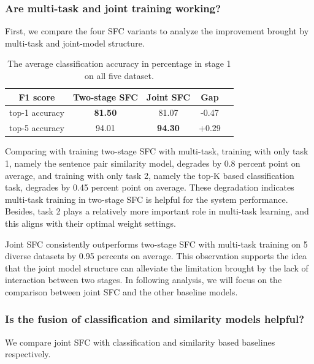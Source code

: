 \subsubsection*{Are multi-task and joint training working?} 
First, we compare the four  SFC  variants to analyze the improvement
brought  by  multi-task  and  joint-model  structure. 

\begin{table}
  \begin{centering}
    \begin{tabular}{|c|c|c|c|c|}
      \hline
      F1 score & Two-stage SFC & Joint SFC & Gap & \tabularnewline
      \hline
      top-1 accuracy  & \textbf{81.50} & 81.07 & -0.47 & \tabularnewline
      top-5 accuracy & 94.01 & \textbf{94.30} & +0.29 & \tabularnewline
      \hline
    \end{tabular}
    \par
  \end{centering}
  \caption{The average classification accuracy in percentage in stage 1 on all five dataset.}
  \label{tbe:top1_5_accuracy}
\end{table}

Comparing with training two-stage SFC with multi-task, training with only task
1,  namely the sentence pair similarity model, degrades by 0.8 percent
point  on average, and training with only task 2, namely the top-K based
classification  task,  degrades  by  0.45  percent  point  on  average.  These
degradation  indicates  multi-task training in two-stage SFC is helpful for the
system  performance.  Besides, task 2 plays a relatively more important role in
multi-task learning, and this aligns with their optimal weight settings.

Joint SFC consistently outperforms two-stage SFC with multi-task training  
on 5 diverse datasets by 0.95 percents  on  average. 
This observation supports the idea that the joint model
structure  can  alleviate  the  limitation  brought by the lack of interaction
between  two  stages.  In  following analysis, we will focus on the comparison
between joint SFC and the other baseline models.

\subsubsection*{Is  the  fusion of classification and similarity models
helpful?}  We  compare  joint SFC with classification and similarity based
baselines respectively.


